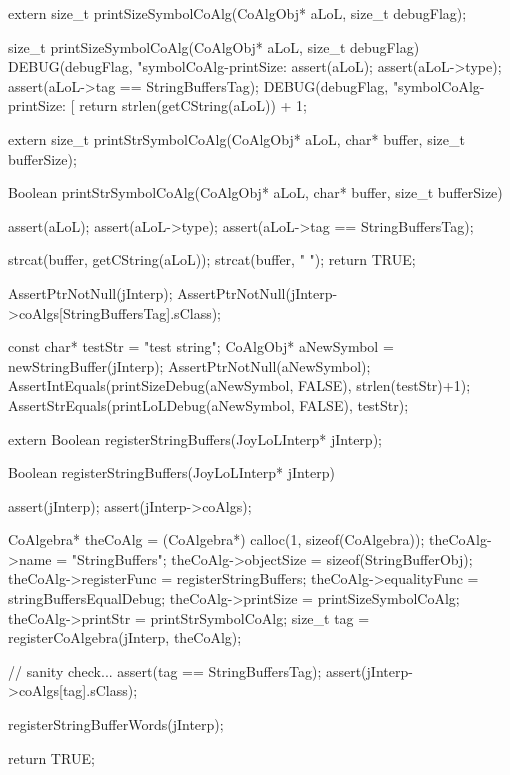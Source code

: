 
\startCHeader
extern size_t printSizeSymbolCoAlg(CoAlgObj* aLoL, size_t debugFlag);
\stopCHeader

\startCCode
size_t printSizeSymbolCoAlg(CoAlgObj* aLoL, size_t debugFlag) {
  DEBUG(debugFlag, "symbolCoAlg-printSize: %
  assert(aLoL);
  assert(aLoL->type);
  assert(aLoL->tag == StringBuffersTag);
  DEBUG(debugFlag, "symbolCoAlg-printSize: [%
  return strlen(getCString(aLoL)) + 1;
}
\stopCCode

\startCHeader
extern size_t printStrSymbolCoAlg(CoAlgObj* aLoL,
                                  char* buffer, size_t bufferSize);
\stopCHeader

\startCCode
Boolean printStrSymbolCoAlg(CoAlgObj* aLoL,
                           char* buffer, size_t bufferSize) {
  assert(aLoL);
  assert(aLoL->type);
  assert(aLoL->tag == StringBuffersTag);

  strcat(buffer, getCString(aLoL));
  strcat(buffer, " ");
  return TRUE;
}
\stopCCode


\startCTest
  AssertPtrNotNull(jInterp);
  AssertPtrNotNull(jInterp->coAlgs[StringBuffersTag].sClass);

  const char* testStr = "test string";
  CoAlgObj* aNewSymbol = newStringBuffer(jInterp);
  AssertPtrNotNull(aNewSymbol);
  AssertIntEquals(printSizeDebug(aNewSymbol, FALSE), strlen(testStr)+1);
  AssertStrEquals(printLoLDebug(aNewSymbol, FALSE), testStr);
\stopCTest
\skipTestCase
\stopTestSuite

\startTestSuite[registerStringBuffers]

\startCHeader
extern Boolean registerStringBuffers(JoyLoLInterp* jInterp);
\stopCHeader
{}

\startCCode
Boolean registerStringBuffers(JoyLoLInterp* jInterp) {
  assert(jInterp);
  assert(jInterp->coAlgs);
  
  CoAlgebra* theCoAlg    = (CoAlgebra*) calloc(1, sizeof(CoAlgebra));
  theCoAlg->name         = "StringBuffers";
  theCoAlg->objectSize   = sizeof(StringBufferObj);
  theCoAlg->registerFunc = registerStringBuffers;
  theCoAlg->equalityFunc = stringBuffersEqualDebug;
  theCoAlg->printSize    = printSizeSymbolCoAlg;
  theCoAlg->printStr     = printStrSymbolCoAlg;
  size_t tag = registerCoAlgebra(jInterp, theCoAlg);
  
  // sanity check...
  assert(tag == StringBuffersTag);
  assert(jInterp->coAlgs[tag].sClass);

  registerStringBufferWords(jInterp);

  return TRUE;
}
\stopCCode

